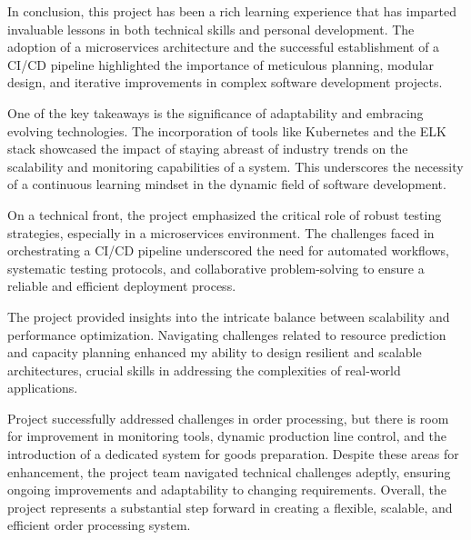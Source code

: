 \documentclass[conference, onecolumn]{IEEEtran}
\begin{document}
In conclusion, this project has been a rich learning experience that has imparted invaluable lessons in both technical skills and personal development. The adoption of a microservices architecture and the successful establishment of a CI/CD pipeline highlighted the importance of meticulous planning, modular design, and iterative improvements in complex software development projects.

One of the key takeaways is the significance of adaptability and embracing evolving technologies. The incorporation of tools like Kubernetes and the ELK stack showcased the impact of staying abreast of industry trends on the scalability and monitoring capabilities of a system. This underscores the necessity of a continuous learning mindset in the dynamic field of software development.

On a technical front, the project emphasized the critical role of robust testing strategies, especially in a microservices environment. The challenges faced in orchestrating a CI/CD pipeline underscored the need for automated workflows, systematic testing protocols, and collaborative problem-solving to ensure a reliable and efficient deployment process.

The project provided insights into the intricate balance between scalability and performance optimization. Navigating challenges related to resource prediction and capacity planning enhanced my ability to design resilient and scalable architectures, crucial skills in addressing the complexities of real-world applications.

Project successfully addressed challenges in order processing, but there is room for improvement in monitoring tools, dynamic production line control, and the introduction of a dedicated system for goods preparation. Despite these areas for enhancement, the project team navigated technical challenges adeptly, ensuring ongoing improvements and adaptability to changing requirements. Overall, the project represents a substantial step forward in creating a flexible, scalable, and efficient order processing system.



\vspace{12pt}
\end{document}
